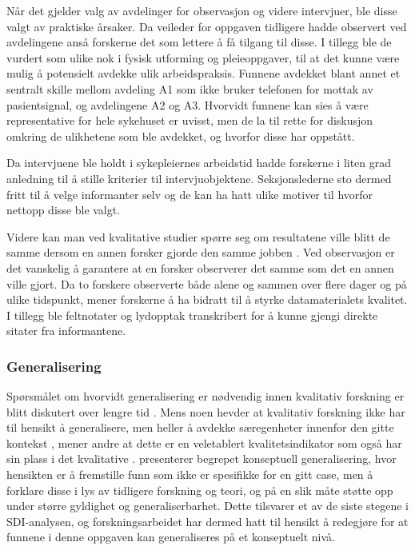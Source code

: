 \noindent
Når det gjelder valg av avdelinger for observasjon og videre intervjuer, ble disse valgt av praktiske årsaker. Da veileder for oppgaven tidligere hadde observert ved avdelingene anså forskerne det som lettere å få tilgang til disse. I tillegg ble de vurdert som ulike nok i fysisk utforming og pleieoppgaver, til at det kunne være mulig å potensielt avdekke ulik arbeidspraksis. Funnene avdekket blant annet et sentralt skille mellom avdeling A1 som ikke bruker telefonen for mottak av pasientsignal, og avdelingene A2 og A3. Hvorvidt funnene kan sies å være representative for hele sykehuset er uvisst, men de la til rette for diskusjon omkring de ulikhetene som ble avdekket, og hvorfor disse har oppstått. 

\noindent
Da intervjuene ble holdt i sykepleiernes arbeidstid hadde forskerne i liten grad anledning til å stille kriterier til intervjuobjektene. Seksjonslederne sto dermed fritt til å velge informanter selv og de kan ha hatt ulike motiver til hvorfor nettopp disse ble valgt. 

\noindent
Videre kan man ved kvalitative studier spørre seg om resultatene ville blitt de samme dersom en annen forsker gjorde den samme jobben \citep{Tjora}. Ved observasjon er det  vanskelig å garantere at en forsker observerer det samme som det en annen ville gjort. Da to forskere observerte både alene og sammen over flere dager og på ulike tidspunkt, mener forskerne å ha bidratt til å styrke datamaterialets kvalitet. I tillegg ble feltnotater og lydopptak transkribert for å kunne gjengi direkte sitater fra informantene.

\subsubsection{Generalisering}
Spørsmålet om hvorvidt generalisering er nødvendig innen kvalitativ forskning er blitt diskutert over lengre tid \citep{Tjora}. Mens noen hevder at kvalitativ forskning ikke har til hensikt å generalisere, men heller å avdekke særegenheter innenfor den gitte kontekst \citep{Creswell, Oates}, mener andre at dette er en veletablert kvalitetsindikator som også har sin plass i det kvalitative \citep{Tjora}. \citet{Tjora} presenterer begrepet konseptuell generalisering, hvor hensikten er å fremstille funn som ikke er spesifikke for en gitt case, men å forklare disse i lys av tidligere forskning og teori, og på en slik måte støtte opp under større gyldighet og generaliserbarhet. Dette tilsvarer et av de siste stegene i SDI-analysen, og forskningsarbeidet har dermed hatt til hensikt å redegjøre for at funnene i denne oppgaven kan generaliseres på et konseptuelt nivå. 

